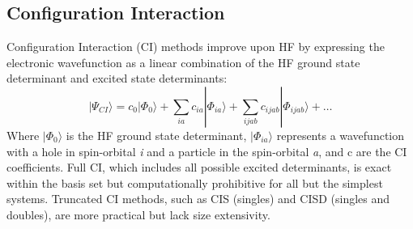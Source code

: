\subsection{Configuration Interaction}
Configuration Interaction (CI) methods improve upon HF by expressing the electronic wavefunction as a linear combination of the HF ground state determinant and excited state determinants:
\begin{equation} \label{eq:CI}
     |\Psi_{CI} \rangle = c_0 |\Phi_0 \rangle + \sum_{ia} c_{ia} |\Phi_{ia} \rangle + \sum_{ijab} c_{ijab} |\Phi_{ijab} \rangle + \dots
\end{equation}
Where $|\Phi_0 \rangle$ is the HF ground state determinant, $|\Phi_{ia} \rangle$ represents a wavefunction with a hole in spin-orbital \textit{i} and a particle in the spin-orbital \textit{a}, and c are the CI coefficients. Full CI, which includes all possible excited determinants, is exact within the basis set but computationally prohibitive for all but the simplest systems. Truncated CI methods, such as CIS (singles) and CISD (singles and doubles), are more practical but lack size extensivity.

